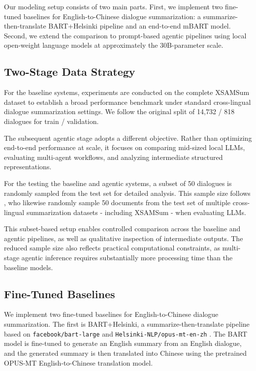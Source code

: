 \documentclass[11pt]{article}
\begin{document}
Our modeling setup consists of two main parts. First, we implement two
fine-tuned baselines for English-to-Chinese dialogue summarization: a
summarize-then-translate BART+Helsinki pipeline and an end-to-end mBART model.
Second, we extend the comparison to prompt-based agentic pipelines using local
open-weight language models at approximately the 30B-parameter scale.

\subsection{Two-Stage Data Strategy}

For the baseline systems, experiments are conducted on the complete XSAMSum dataset to establish a broad performance benchmark under standard cross-lingual dialogue summarization settings. We follow the original split of 14,732 / 818 dialogues for train / validation.

The subsequent agentic stage adopts a different objective. Rather than optimizing end-to-end performance at scale, it focuses on comparing mid-sized local LLMs, evaluating multi-agent workflows, and analyzing intermediate structured representations. 

For the testing the baseline and agentic systems, a subset of 50 dialogues is randomly sampled from the test set for detailed analysis. This sample size follows \citet{wang-etal-2023-zero-shot-cls}, who likewise randomly sample 50 documents from the test set of multiple cross-lingual summarization datasets - including XSAMSum - when evaluating LLMs.

This subset-based setup enables controlled comparison across the baseline and agentic pipelines, as well as qualitative inspection of intermediate outputs. The reduced sample size also reflects practical computational constraints, as multi-stage agentic inference requires substantially more processing time than the baseline models.


\subsection{Fine-Tuned Baselines}

We implement two fine-tuned baselines for English-to-Chinese dialogue
summarization. The first is BART+Helsinki, a summarize-then-translate pipeline
based on \texttt{facebook/bart-large} \citep{lewis2020bart} and
\texttt{Helsinki-NLP/opus-mt-en-zh} \citep{tiedemann2020opusmt}. The BART model
is fine-tuned to generate an English summary from an English dialogue, and the
generated summary is then translated into Chinese using the pretrained OPUS-MT
English-to-Chinese translation model.
\end{document}
